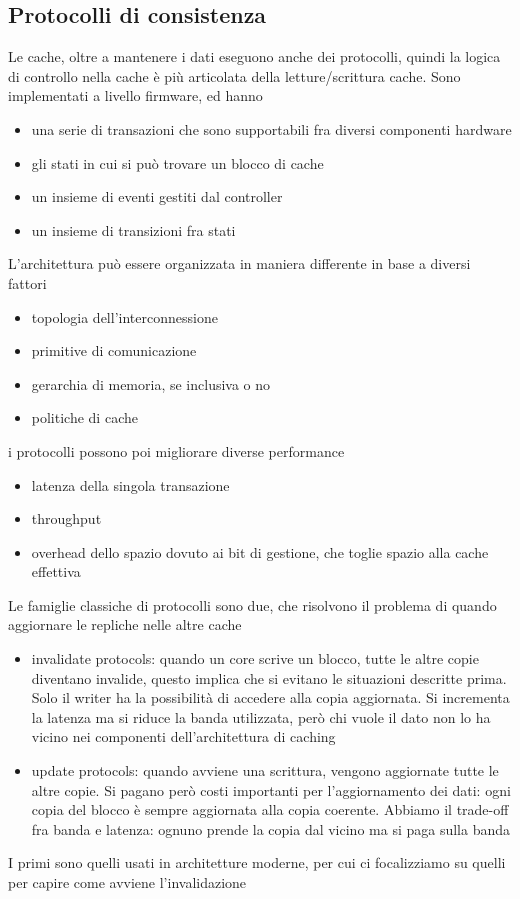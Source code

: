 \documentclass[12pt, oneside]{extbook}
\begin{document}
\subsection{Protocolli di consistenza}
Le cache, oltre a mantenere i dati eseguono anche dei protocolli, quindi la logica di controllo nella cache è più articolata della letture/scrittura cache. Sono implementati a livello firmware, ed hanno 
\begin{itemize}
\item una serie di transazioni che sono supportabili fra diversi componenti hardware
\item gli stati in cui si può trovare un blocco di cache
\item un insieme di eventi gestiti dal controller
\item un insieme di transizioni fra stati
\end{itemize}
L'architettura può essere organizzata in maniera differente in base a diversi fattori
\begin{itemize}
\item topologia dell'interconnessione
\item primitive di comunicazione
\item gerarchia di memoria, se inclusiva o no
\item politiche di cache
\end{itemize}
i protocolli possono poi migliorare diverse performance
\begin{itemize}
\item latenza della singola transazione
\item throughput 
\item overhead dello spazio dovuto ai bit di gestione, che toglie spazio alla cache effettiva
\end{itemize}
Le famiglie classiche di protocolli sono due, che risolvono il problema di quando aggiornare le repliche nelle altre cache 
\begin{itemize}
\item invalidate protocols: quando un core scrive un blocco, tutte le altre copie diventano invalide, questo implica che si evitano le situazioni descritte prima. Solo il writer ha la possibilità di accedere alla copia aggiornata. Si incrementa la latenza ma si riduce la banda utilizzata, però chi vuole il dato non lo ha vicino nei componenti dell'architettura di caching
\item update protocols: quando avviene una scrittura, vengono aggiornate tutte le altre copie. Si pagano però costi importanti per l'aggiornamento dei dati: ogni copia del blocco è sempre aggiornata alla copia coerente. Abbiamo il trade-off fra banda e latenza: ognuno prende la copia dal vicino ma si paga sulla banda
\end{itemize}
I primi sono quelli usati in architetture moderne, per cui ci focalizziamo su quelli per capire come avviene l'invalidazione
\end{document}
